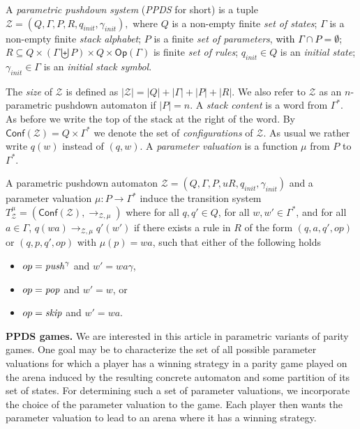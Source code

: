 \documentclass[a4paper,UKenglish,cleveref, autoref, thm-restate]{lipics-v2021}
\newcommand{\Conf}{\mathsf{Conf}}
\newcommand{\Op}{\mathsf{Op}}
\begin{document}
\par\noindent\ignorespacesafterend
A {\em parametric pushdown system} ({\em PPDS} for short) 
is a tuple $\mathcal{Z} = (Q, \Gamma, P, R, q_{init},\gamma_{init}),$ where
 $Q$ is a non-empty finite {\em set of  states};
 $\Gamma$ is a non-empty finite {\em  stack alphabet};
 $P$ is a finite {\em   set of parameters}, \textcolor{black}{with $\Gamma \cap P = \emptyset$};
  $R   \subseteq  Q  \times (\Gamma \biguplus P)  \times Q  \times \Op(\Gamma)$ is finite {\em  set of rules};
 $q_{init}\in Q$ is an {\em initial  state};
 $ \gamma_{init} \in \Gamma$ is an {\em initial stack symbol}.


The {\em size} of $\mathcal{Z}$ is defined as
$|\mathcal{Z}| = |Q| + |\Gamma| + |P| + |R| $.
We also refer to $\mathcal{Z}$ as an $n$-parametric pushdown automaton if $|P| = n$.
A {\em stack content} is a word from $ \Gamma^*$. 
As before we write the top
of the stack at the right of the word. 
By $\Conf(\mathcal{Z})=Q\times  \Gamma^*$ we denote the set of
{\em configurations} of $\mathcal{Z}$. As usual we rather write $q(w)$ instead of $(q, w)$.
A {\em parameter valuation} is a function $\mu$ from $P$ to $\Gamma^*$.

\begin{samepage}
A parametric pushdown automaton  $\mathcal{Z}= (Q, \Gamma, P,u R, q_{init}, \gamma_{init})$ 
and a parameter valuation $\mu: P\rightarrow \Gamma^*$ induce the 
transition system  
$T_{\mathcal{Z}}^{\mu} = (\Conf(\mathcal{Z}), 
\rightarrow_{\mathcal{Z},\mu})$ where
for all $ q, q'  \in  Q$, 
for all $ w,w' \in \Gamma^* $, and 
for all $ a  \in  \Gamma$, 
$q(wa) \rightarrow_{\mathcal{Z},\mu} q'(w')$
if there exists a rule in $R$
 of the form $(q,a,q', op)$ or $(q,p,q', op)$ with $\mu(p)=wa$,
such that
either of the following holds
\begin{itemize}
\item $ op = \text{\textit{push}}^\gamma$ and $w' = wa\gamma$,

\item $ op = \text{\textit{pop}}$ and $w' = w$, or

\item $ op = \text{\textit{skip}}$ and $w' = wa$.
\end{itemize}
\end{samepage}








\textbf{PPDS games.}
We are interested in this article in parametric variants of parity games.
One goal may be to characterize the set of all possible parameter valuations for which a player has a winning strategy in a parity game
played on the arena induced by the
resulting concrete automaton
and some partition of its set of states. 
For determining such a set of parameter valuations, we incorporate the choice of the parameter valuation to the game. Each player then wants the parameter valuation to lead to an arena where it has a winning strategy.
\end{document}
